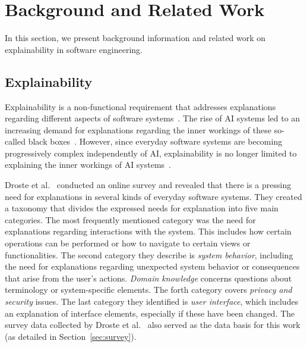 \section{Background and Related Work}
\label{sec:background}

In this section, we present background information and related work on explainability in software engineering.

\subsection{Explainability}
\label{sec:erklearbarkeit}

Explainability is a non-functional requirement that addresses explanations regarding different aspects of software systems~\cite{chazette2021exploring}. The rise of AI systems led to an increasing demand for explanations regarding the inner workings of these so-called black boxes~\cite{das2020XAISurvey}. However, since everyday software systems are becoming progressively complex independently of AI, explainability is no longer limited to explaining the inner workings of AI systems~\cite{brunotte2023privacy,chazette2022framework,deters2024qualitymodel,obaidi2025appKonwledge,obaidi2025automatingexplanationneedmanagement,droste2024explanations}. 

Droste et al.~\cite{droste2024explanations} conducted an online survey and revealed that there is a pressing need for explanations in several kinds of everyday software systems. They created a taxonomy that divides the expressed needs for explanation into five main categories. The most frequently mentioned category was the need for explanations regarding interactions with the system. This includes how certain operations can be performed or how to navigate to certain views or functionalities. The second category they describe is \textit{system behavior}, including the need for explanations regarding unexpected system behavior or consequences that arise from the user's actions. \textit{Domain knowledge} concerns questions about terminology or system-specific elements. The forth category covers \textit{privacy and security} issues. The last category they identified is \textit{user interface}, which includes an explanation of interface elements, especially if these have been changed. The survey data collected by Droste et al.~\cite{droste2024explanations} also served as the data basis for this work (as detailed in Section~\ref{sec:survey}).

